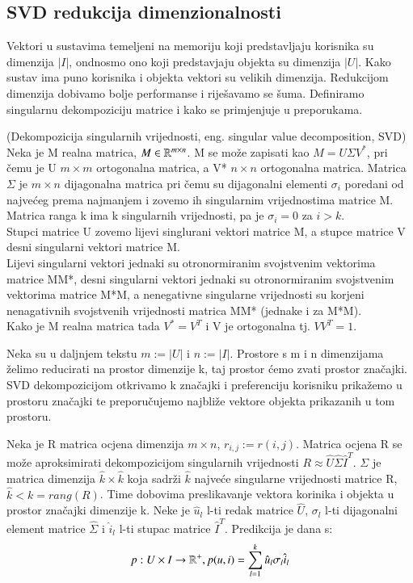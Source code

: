 \documentclass[a4paper,oneside,12pt]{memoir} %
\begin{document}
\subsection{SVD redukcija dimenzionalnosti}
\par
Vektori u sustavima temeljeni na memoriju koji predstavljaju korisnika su dimenzija $|I|$, ondnosmo ono koji predstavjaju objekta su dimenzija $|U|$. Kako sustav ima puno korisnika i objekta vektori su velikih dimenzija. Redukcijom dimenzija dobivamo bolje performanse i riješavamo se šuma. Definiramo singularnu dekompoziciju matrice i kako se primjenjuje u preporukama.
\begin{defn} (Dekompozicija singularnih vrijednosti, eng. singular value decomposition, SVD)
\\Neka je M realna matrica, $M\in \mathbb{R}^{m\times n}$. M se može zapisati kao $M=U\Sigma V^*$, pri čemu je U $m\times m$ ortogonalna matrica, a V* $n\times n$ ortogonalna matrica. Matrica $\Sigma$ je $m\times n$ dijagonalna matrica pri čemu su dijagonalni elementi $\sigma_i$ poredani od najvećeg prema najmanjem i zovemo ih singularnim vrijednostima matrice M. Matrica ranga k ima k singularnih vrijednosti, pa je $\sigma_i=0$ za $i>k$.
\\ Stupci matrice U zovemo lijevi singlurani vektori matrice M, a stupce matrice V desni singularni vektori matrice M.
\\ Lijevi singularni vektori jednaki su otronormiranim svojstvenim vektorima matrice MM*, desni singularni vektori jednaki su otronormiranim svojstvenim vektorima matrice M*M, a nenegativne singularne vrijednosti su korjeni nenagativnih svojstvenih vrijednosti matrica MM* (jednake i za M*M).
\\ Kako je M realna matrica tada $V^*=V^T$ i V je ortogonalna tj. $VV^T=1$.
\end{defn}
Neka su u daljnjem tekstu $m:=|U|$ i $n:=|I|$. Prostore s m i n dimenzijama želimo reducirati na prostor dimenzije k, taj prostor ćemo zvati prostor značajki. SVD dekompozicijom otkrivamo k značajki i preferenciju korisniku prikažemo u prostoru značajki te preporučujemo najbliže vektore objekta prikazanih u tom prostoru.
\begin{defn} Neka je R matrica ocjena dimenzija $m\times n$, $r_{i,j}:=r(i,j)$. Matrica ocjena R se može aproksimirati dekompozicijom singularnih vrijednosti $R \approx \hat{U} \hat{\Sigma} \hat{I}^T$. $\Sigma$ je matrica dimenzija $\hat{k}\times \hat{k}$ koja sadrži $\hat{k}$ najveće singularne vrijednosti matrice R, $\hat{k}<k=rang(R)$. Time dobovima preslikavanje vektora korinika i objekta u prostor značajki dimenzije k. Neke je $\hat{u}_l$ l-ti redak matrice $\hat{U}$, $\sigma_l$ l-ti dijagonalni element matrice $\hat{\Sigma}$ i $\hat{i}_l$ l-ti stupac matrice $\hat{I}^T$. Predikcija je dana s:
\[ p:U\times I \rightarrow \mathbb{R}^+, p(u,i) = \sum_{l=1}^k \hat{u}_l \sigma_l \hat{i}_l \]
\end{defn}
\end{document}
